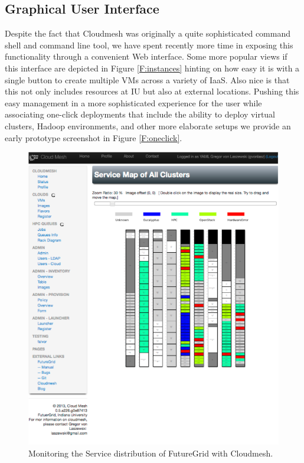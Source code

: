 \documentclass[graybox]{svmult}
\begin{document}
\subsection{Graphical User Interface}

Despite the fact that Cloudmesh was originally a quite sophisticated command shell and command line tool, we have spent recently more time in exposing this functionality through a convenient Web interface. Some more popular views if this interface are depicted in Figure \ref{F:instances} hinting on how easy it is with a single button to create multiple VMs across a variety of IaaS. Also nice is that this not only includes resources at IU but also at external locations. Pushing this easy management in a more sophisticated experience for the user while associating one-click deployments that include the ability to deploy virtual clusters, Hadoop environments, and other more elaborate setups we provide an early prototype screenshot in Figure \ref{F:oneclick}.


\begin{figure}[htb]
  \centering
    \includegraphics[width=.7\textwidth]{images/rainbow.pdf}
  \caption{Monitoring the Service distribution of FutureGrid with Cloudmesh.}
\end{figure}
\end{document}
